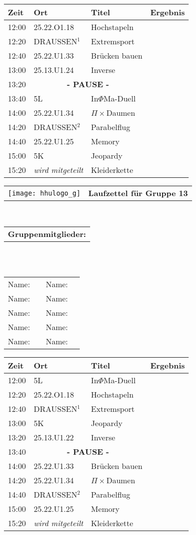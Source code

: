 \documentclass[a4paper,10pt]{article}
\def\spiela{25.22.U1.33 & Brücken bauen}
\def\spielb{DRAUSSEN$^1$ \footnotetext[1]{zwischen 25.22.U1 und 25.13.U1} & Extremsport}
\def\spielc{25.22.O1.18 & Hochstapeln}
\def\spield{5L & In$\Phi $Ma-Duell}
\def\spiele{ 25.13.U1.22 & Inverse}
\def\spielee{ 25.13.U1.24 & Inverse}
\def\spielf{5K & Jeopardy}
\def\spielgg{25.22.U1.25 & Memory}
\def\spielh{DRAUSSEN$^2$ \footnotetext[2]{zwischen 25.22.U1 und 25.33.U1} & Parabelflug}
\def\spieli{ 25.22.U1.34 & $\Pi \times $Daumen}
\def\spielj{\textit{wird mitgeteilt} & Kleiderkette}
\def\pause{\multicolumn{2}{|c|}{\textbf{- PAUSE -}}}
\newcommand{\oben}[1]{

\begin{tabularx}{\textwidth}{lc}
  \texttt{[image: hhulogo\_g]}
& {\Huge \textbf{Laufzettel für Gruppe #1}}
\end{tabularx}
\large
\vspace{0.5cm} \\
\begin{tabularx}{\textwidth}{l}\textbf{Gruppenmitglieder:} \end{tabularx}\\ \phantom{blub}\\
\begin{tabularx}{\textwidth}{p{0.1\textwidth}p{0.4\textwidth}p{0.1\textwidth}p{0.4\textwidth}}
Name: & \underline{\hspace{6cm}} & Name: & \underline{\hspace{6cm}}\\
Name: & \underline{\hspace{6cm}} & Name: & \underline{\hspace{6cm}}\\
Name: & \underline{\hspace{6cm}} & Name: & \underline{\hspace{6cm}}\\
Name: & \underline{\hspace{6cm}} & Name: & \underline{\hspace{6cm}}\\
Name: & \underline{\hspace{6cm}} & Name: & \underline{\hspace{6cm}}\\
\end{tabularx}



}
\begin{document}
  \LARGE
  \begin{center}
  \vspace{1cm}
  \begin{tabularx}{\textwidth}{p{2.5cm}||p{4.5cm}|p{6.5cm}|l}

  \textbf{Zeit}  & \textbf{Ort} 	&\textbf{Titel} 		& \textbf{Ergebnis} 	\\ \hline \hline

  12:00 &\spielc			&		\\ \hline
  12:20 &\spielb			&		\\ \hline
  12:40 &\spiela			&		\\ \hline

  13:00 &\spielee		 	&		\\ \hline
  13:20 &\pause			&		\\ \hline
  13:40 &\spield			&		\\ \hline

  14:00 &\spieli			&		\\ \hline
  14:20 &\spielh			&		\\ \hline
  14:40 &\spielgg			&		\\ \hline 

  15:00 &\spielf			&		\\ \hline \hline
  15:20 &\spielj			&

  \end{tabularx}
  \end{center}

  \newpage


  \oben{13}

  \LARGE
  \begin{center}
  \vspace{1cm}
  \begin{tabularx}{\textwidth}{p{2.5cm}||p{4.5cm}|p{6.5cm}|l}

  \textbf{Zeit}  & \textbf{Ort} 	&\textbf{Titel} 		& \textbf{Ergebnis} 	\\ \hline \hline

  12:00 &\spield			&		\\ \hline
  12:20 &\spielc			&		\\ \hline
  12:40 &\spielb			&		\\ \hline

  13:00 &\spielf		 	&		\\ \hline
  13:20 &\spiele			&		\\ \hline
  13:40 &\pause			&		\\ \hline

  14:00 &\spiela			&		\\ \hline
  14:20 &\spieli			&		\\ \hline
  14:40 &\spielh			&		\\ \hline 

  15:00 &\spielgg			&		\\ \hline \hline
  15:20 &\spielj			&

  \end{tabularx}
  \end{center}
\end{document}
